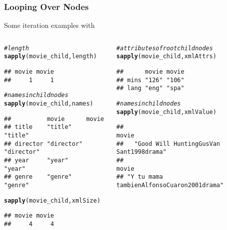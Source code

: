 \documentclass[12pt]{beamer}\usepackage[]{graphicx}\usepackage[]{color}
\makeatletter
\newcommand{\hlcom}[1]{\textcolor[rgb]{0.678,0.584,0.686}{\textit{#1}}}%
\newcommand{\hlstd}[1]{\textcolor[rgb]{0.345,0.345,0.345}{#1}}%
\newcommand{\hlkwd}[1]{\textcolor[rgb]{0.737,0.353,0.396}{\textbf{#1}}}%
\newenvironment{kframe}{%
 \def\at@end@of@kframe{}%
 \ifinner\ifhmode%
  \def\at@end@of@kframe{\end{minipage}}%
  \begin{minipage}{\columnwidth}%
 \fi\fi%
 \def\FrameCommand##1{\hskip\@totalleftmargin \hskip-\fboxsep
 \colorbox{shadecolor}{##1}\hskip-\fboxsep
     \hskip-\linewidth \hskip-\@totalleftmargin \hskip\columnwidth}%
 \MakeFramed {\advance\hsize-\width
   \@totalleftmargin\z@ \linewidth\hsize
   \@setminipage}}%
 {\par\unskip\endMakeFramed%
 \at@end@of@kframe}
\newenvironment{knitrout}{}{} %
\makeatother
\begin{document}
\begin{frame}[fragile]
\frametitle{Looping Over Nodes}

Some iteration examples with {\hilit {}}

\begin{columns}[t]
\begin{column}{0.5\textwidth}
\begin{knitrout}\tiny
{}\color{fgcolor}\begin{kframe}
\begin{alltt}
\hlcom{# length}
\hlkwd{sapply}\hlstd{(movie_child, length)}
\end{alltt}
\begin{verbatim}
## movie movie 
##     1     1
\end{verbatim}
\begin{alltt}
\hlcom{# names in child nodes}
\hlkwd{sapply}\hlstd{(movie_child, names)}
\end{alltt}
\begin{verbatim}
##          movie      movie     
## title    "title"    "title"   
## director "director" "director"
## year     "year"     "year"    
## genre    "genre"    "genre"
\end{verbatim}
\begin{alltt}
\hlkwd{sapply}\hlstd{(movie_child, xmlSize)}
\end{alltt}
\begin{verbatim}
## movie movie 
##     4     4
\end{verbatim}
\end{kframe}
\end{knitrout}
\end{column}

\begin{column}{0.5\textwidth}
\begin{knitrout}\tiny
{}\color{fgcolor}\begin{kframe}
\begin{alltt}
\hlcom{# attributes of root child nodes}
\hlkwd{sapply}\hlstd{(movie_child, xmlAttrs)}
\end{alltt}
\begin{verbatim}
##      movie movie
## mins "126" "106"
## lang "eng" "spa"
\end{verbatim}
\begin{alltt}
\hlcom{# names in child nodes}
\hlkwd{sapply}\hlstd{(movie_child, xmlValue)}
\end{alltt}
\begin{verbatim}
##                                     movie 
##   "Good Will HuntingGusVan Sant1998drama" 
##                                     movie 
## "Y tu mama tambienAlfonsoCuaron2001drama"
\end{verbatim}
\end{kframe}
\end{knitrout}
\end{column}
\end{columns}

\end{frame}
\end{document}

